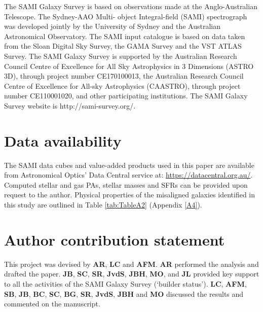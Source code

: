 \documentclass[fleqn,usenatbib]{mnras}
\begin{document}
The SAMI Galaxy Survey is based on observations made at the Anglo-Australian Telescope. The Sydney-AAO Multi- object Integral-field (SAMI) spectrograph was developed jointly by the University of Sydney and the Australian Astronomical Observatory. The SAMI input catalogue is based on data taken from the Sloan Digital Sky Survey, the GAMA Survey and the VST ATLAS Survey. The SAMI Galaxy Survey is supported by the Australian Research Council Centre of Excellence for All Sky Astrophysics in 3 Dimensions (ASTRO 3D), through project number CE170100013, the Australian Research Council Centre of Excellence for All-sky Astrophysics (CAASTRO), through project number CE110001020, and other participating institutions. The SAMI Galaxy Survey website is http://sami-survey.org/.

\section*{Data availability}

The SAMI data cubes and value-added products used in this paper are available from Astronomical Optics’ Data Central service at: \url{https://datacentral.org.au/}. Computed stellar and gas PAs, stellar masses and SFRs can be provided upon request to the author. Physical properties of the misaligned galaxies identified in this study are outlined in Table \ref{tab:TableA2} (Appendix \ref{A4}).

\section*{Author contribution statement}

This project was devised by \textbf{AR}, \textbf{LC} and \textbf{AFM}. \textbf{AR} performed the analysis and drafted the paper. \textbf{JB}, \textbf{SC}, \textbf{SR}, \textbf{JvdS}, \textbf{JBH}, \textbf{MO}, and \textbf{JL} provided key support to all the activities of the SAMI Galaxy Survey (`builder status’). \textbf{LC}, \textbf{AFM}, \textbf{SB}, \textbf{JB}, \textbf{BC}, \textbf{SC}, \textbf{BG}, \textbf{SR}, \textbf{JvdS}, \textbf{JBH} and \textbf{MO} discussed the results and commented on the manuscript.



 

\end{document}
